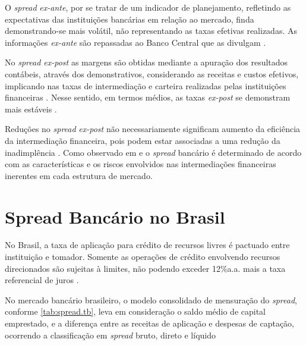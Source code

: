\documentclass[12pt,openright,oneside,a4paper,chapter=TITLE,section=TITLE,subsection=Title,english,french,spanish,portugues,sumario=tradicional]{04-class-files/abntex2}
\begin{document}
O \emph{spread} \emph{ex-ante}, por se tratar de um indicador de planejamento, refletindo as expectativas das instituições bancárias em relação ao mercado, finda
demonstrando-se mais volátil, não representando as taxas efetivas realizadas.
As informações \emph{ex-ante} são repassadas ao Banco Central que as divulgam
\cite{durigan:2018, leal:2006, dantas:2012}.

No \emph{spread ex-post} as margens são obtidas mediante a apuração dos resultados
contábeis, através dos demonstrativos, considerando as receitas e custos
efetivos, implicando nas taxas de intermediação e carteira realizadas pelas
instituições financeiras \cite{kunt:1999, durigan:2018}. Nesse sentido, em
termos médios, as taxas \emph{ex-post} se demonstram mais estáveis \cite{leal:2006, dantas:2012}.

Reduções no \emph{spread} \emph{ex-post} não necessariamente significam aumento da eficiência da intermediação financeira, pois podem estar associadas a uma redução da inadimplência \cite{kunt:1999}. Como observado em \textcite{klein:1971} e \textcite{ho-saunders:1981} o \emph{spread} bancário é determinado de acordo com as características e os riscos envolvidos nas intermediações financeiras inerentes em cada estrutura de mercado.

\section{Spread Bancário no Brasil}

No Brasil, a taxa de aplicação para crédito de recursos livres é pactuado entre instituição e tomador. Somente as operações de crédito envolvendo recursos direcionados são sujeitas à limites, não podendo exceder 12\%a.a. mais a taxa referencial de juros \cite{BCB:2016}.

No mercado bancário brasileiro, o modelo consolidado de mensuração do \emph{spread},
conforme \autoref{tab:spread.tb}, leva em consideração o saldo médio de capital
emprestado, e a diferença entre as receitas de aplicação e despesas de
captação, ocorrendo a classificação em \emph{spread} bruto, direto e líquido
\cite{fipecafi:2005}
\end{document}
